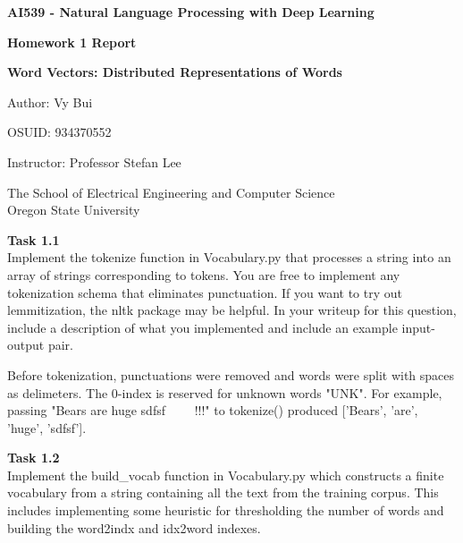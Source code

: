 \documentclass[12pt,article]{article}
\newenvironment{task}[2][Task]
    { \begin{mdframed}[backgroundcolor=gray!20] \textbf{#1 #2} \\}
    {  \end{mdframed}}
\begin{document}
\begin{titlepage}
    \begin{center}
        \vspace*{4cm}

        \textbf{\Large AI539 - Natural Language Processing with Deep Learning}

        \vspace{0.5cm}
 
        \textbf{ Homework 1 Report}

        \textbf{ Word Vectors: Distributed Representations of Words}
 
        \vspace{1cm}

        Author: Vy Bui

        OSUID: 934370552

        \vspace{1cm}

        Instructor: Professor Stefan Lee
        \vfill
             
        \vspace{0.8cm}
      
             
        The School of Electrical Engineering and Computer Science\\
        Oregon State University\\
             
    \end{center}
\end{titlepage}

\begin{task}{1.1} 
Implement the tokenize function in Vocabulary.py that processes a string into an array of strings corresponding to tokens. You are free to implement any tokenization schema that eliminates punctuation. If you want to try out lemmitization, the nltk package may be helpful. In your writeup for this question, include a description of what you implemented and include an example input-output pair.
\end{task}

Before tokenization, punctuations were removed and words were split with spaces as delimeters. The 0-index is reserved for unknown words "UNK". For example, passing "Bears are huge sdfsf ~~~~!!!" to tokenize() produced ['Bears', 'are', 'huge', 'sdfsf'].

\begin{task}{1.2} 
Implement the build\_vocab function in Vocabulary.py which constructs a finite vocabulary from a string containing all the text from the training corpus. This includes implementing some heuristic for thresholding the number of words and building the word2indx and idx2word indexes.
\end{task}
\end{document}
